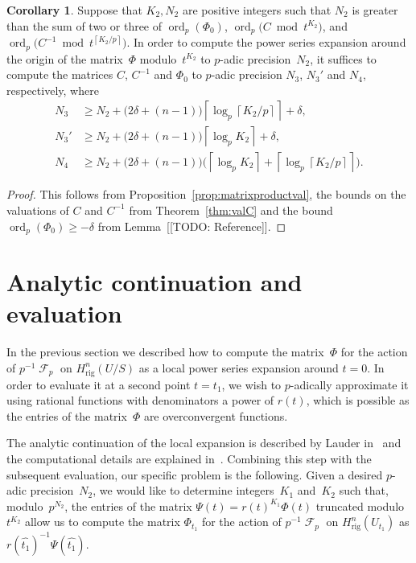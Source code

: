 \documentclass[a4paper,11pt]{article}
\numberwithin{equation}{section}
\providecommand{\ceil}[1]{\left\lceil#1\right\rceil}   %
\DeclareMathOperator{\ord}{ord}          %
\DeclareMathOperator{\Frob}{\mathcal{F}} %
\providecommand{\Hrig}{H_{\text{rig}}}  %
\theoremstyle{definition}
\newtheorem{cor}[thm]{Corollary}
\begin{document}
\begin{cor}
Suppose that $K_2, N_2$ are positive integers such that $N_2$ is greater than 
the sum of two or three of $\ord_p(\Phi_0)$, $\ord_p\bigl(C \bmod t^{K_2}\bigr)$, 
and $\ord_p\bigl(C^{-1} \bmod{t^{\ceil{K_2/p}}}\bigr)$.
In order to compute the power series expansion around the origin 
of the matrix~$\Phi$ modulo~$t^{K_2}$ to $p$-adic precision~$N_2$, it 
suffices to compute the matrices $C$, $C^{-1}$ and $\Phi_0$ to 
$p$-adic precision $N_3$, $N_3'$ and $N_4$, respectively, where 
\begin{align*}
N_3  & \geq N_2 + \bigl(2\delta+(n-1)\bigr) \ceil{\log_p \ceil{K_2/p}} + \delta, \\
N_3' & \geq N_2 + \bigl(2\delta+(n-1)\bigr) \ceil{\log_p K_2} + \delta, \\
N_4  & \geq N_2 + \bigl(2\delta+(n-1)\bigr) \bigl(\ceil{\log_p K_2} + \ceil{\log_p \ceil{K_2/p}}\bigr).
\end{align*}
\end{cor}

\begin{proof}
This follows from Proposition~\ref{prop:matrixproductval}, the bounds 
on the valuations of $C$ and $C^{-1}$ from Theorem~\ref{thm:valC} and 
the bound $\ord_p(\Phi_0) \geq - \delta$ from Lemma~[[TODO: Reference]].
\end{proof}


\section{Analytic continuation and evaluation}
\label{sec:Evaluation}

In the previous section we described how to compute the matrix~$\Phi$ 
for the action of $p^{-1} \Frob_p$ on $\Hrig^{n}(U/S)$ 
as a local power series expansion around $t = 0$.  In order to evaluate it 
at a second point $t = t_1$, we wish to $p$-adically approximate it 
using rational functions with denominators a power of $r(t)$, which 
is possible as the entries of the matrix~$\Phi$ are overconvergent 
functions.

The analytic continuation of the local expansion is described by Lauder 
in~\citep[\S 5.2]{Lauder2006} and the computational details are explained 
in~\citep[\S 8.1]{Lauder2004a}.  Combining this step with the subsequent 
evaluation, our specific problem is the following.  Given a desired 
$p$-adic precision~$N_2$, we would like to determine integers~$K_1$ 
and~$K_2$ such that, modulo~$p^{N_2}$, the entries of the matrix 
$\Psi(t) = r(t)^{K_1} \Phi(t)$ truncated modulo~$t^{K_2}$ allow us to 
compute the matrix $\Phi_{t_1}$ for the action of $p^{-1} \Frob_p$ 
on $\Hrig^{n}(U_{t_1})$ as $r(\hat{t_1})^{-1} \Psi(\hat{t_1})$.
\end{document}
